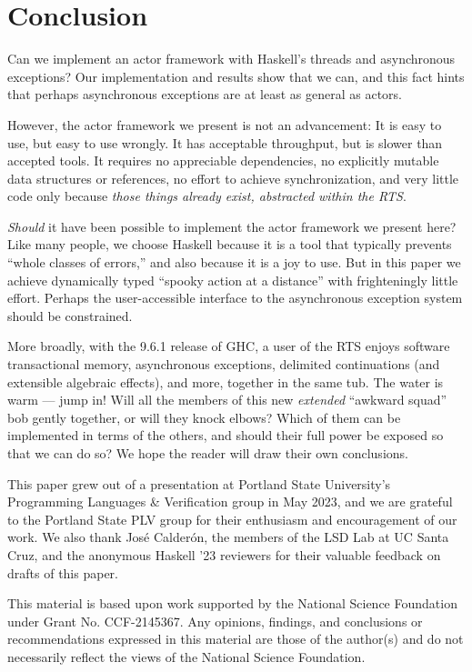 \documentclass[sigplan,screen]{acmart}
\begin{document}
\section{Conclusion}
\label{sec:conclusion}

Can we implement an actor framework with Haskell's threads and asynchronous
exceptions?
%
Our implementation and results show that we can, and this fact hints that
perhaps asynchronous exceptions are at least as general as actors.


However, the actor framework we present is not an advancement:
%
It is easy to use, but easy to use wrongly.
%
It has acceptable throughput, but is slower than accepted
tools.
%
It requires no appreciable dependencies, no explicitly mutable data structures
or references, no effort to achieve synchronization, and very little code only
because \emph{those things already exist, abstracted within the RTS}.


\emph{Should} it have been possible to implement the actor framework we present
here?
%
Like many people, we choose Haskell because it is a tool that typically
prevents ``whole classes of errors,'' and also because it is a joy to use.
%
But in this paper we achieve dynamically typed ``spooky action at a distance''
with frighteningly little effort.
%
Perhaps the user-accessible interface to the asynchronous exception system
should be constrained.

More broadly,
with the 9.6.1 release of  GHC,
a user of the RTS enjoys
software transactional memory,
asynchronous exceptions,
delimited continuations (and extensible algebraic effects),
and more,
together in the same tub.
%
The water is warm --- jump in!
%
Will all the members of this new \emph{extended} ``awkward squad''
\cite{peytonjones2001tackling} bob gently together, or will they knock elbows?
%
Which of them can be implemented in terms of the
others, and should their full power be exposed so that we can do so?
%
We hope the reader will draw their own conclusions.









\begin{acks}
This paper grew out of a presentation at Portland State University's Programming Languages \& Verification group in May 2023, and we are grateful to the Portland State PLV group for their enthusiasm and encouragement of our work.
%
We also thank Jos\'{e} Calder\'{o}n, the members of the LSD Lab at UC Santa Cruz, and the anonymous Haskell '23 reviewers for their valuable feedback on drafts of this paper.

This material is based upon work supported by the National Science Foundation under Grant No. CCF-2145367. Any opinions, findings, and conclusions or recommendations expressed in this material are those of the author(s) and do not necessarily reflect the views of the National Science Foundation.
\end{acks}
\end{document}

